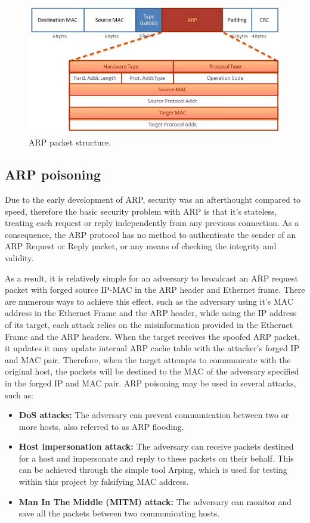 \documentclass[12pt, oneside]{book}
\begin{document}
\begin{figure}[H]
	\centering
	\includegraphics[scale=0.8]{images/arp-packet-format.jpg}
	\caption{ARP packet structure.}
	\label{fig:arp_packet}
\end{figure}

\subsection{ARP poisoning}
Due to the early development of ARP, security was an afterthought compared to speed,
therefore the basic security problem with ARP is that it's stateless, treating each request or reply
independently from any previous connection.
As a consequence, the ARP protocol has no method to authenticate the
sender of an ARP Request or Reply packet, or any means of checking the integrity and validity.

As a result, it is relatively simple for an adversary to broadcast an ARP request packet with forged source IP-MAC in the ARP header and Ethernet frame.
There are numerous ways to achieve this effect, such as the adversary using it's MAC address in the Ethernet Frame and the ARP header,
while using the IP address of its target, each attack relies on the misinformation
provided in the Ethernet Frame and the ARP headers.
When the target receives the spoofed ARP packet, it updates it may update internal ARP cache table with the attacker’s forged IP and MAC pair.
Therefore, when the target attempts to communicate with the original host, the packets will be destined to the MAC of the
adversary specified in the forged IP and MAC pair.
ARP poisoning may be used in several attacks, such as:

\begin{itemize}

  \item \textbf{DoS attacks:} The adversary can prevent communication between two or more hosts, also referred to as ARP flooding.
  \item \textbf{Host impersonation attack:} The adversary can receive packets destined for a host and impersonate and reply to these packets on their behalf.
        This can be achieved through the simple tool Arping, which is used for testing within this project by falsifying MAC address.
  \item \textbf{Man In The Middle (MITM) attack:} The adversary can monitor and save all the packets between two communicating hosts.
\end{itemize}
\end{document}
